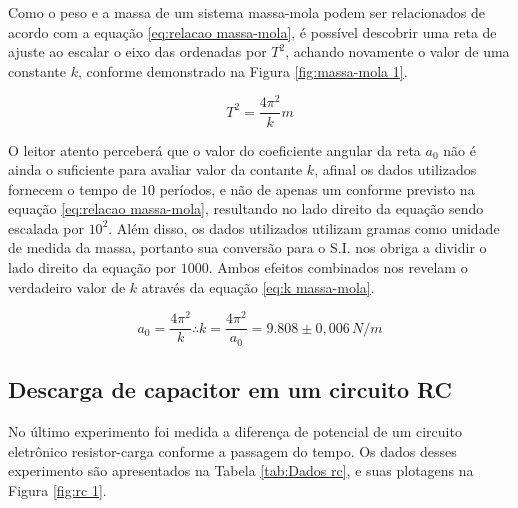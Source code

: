 \documentclass{article}
\begin{document}
Como o peso e a massa de um sistema massa-mola podem ser relacionados de acordo
com a equação \eqref{eq:relacao massa-mola}, é possível descobrir uma reta de
ajuste ao escalar o eixo das ordenadas por $T^2$, achando novamente o valor de
uma constante $k$, conforme demonstrado na Figura \ref{fig:massa-mola 1}.

\begin{equation}
    \label{eq:relacao massa-mola}
    T^2 = \frac{4\pi^2}{k}m
\end{equation}

O leitor atento perceberá que o valor do coeficiente angular da reta $a_0$ não é
ainda o suficiente para avaliar valor da contante $k$, afinal os dados
utilizados fornecem o tempo de $10$ períodos, e não de apenas um conforme
previsto na equação \eqref{eq:relacao massa-mola}, resultando no lado direito da
equação sendo escalada por $10^2$. Além disso, os dados utilizados utilizam
gramas como unidade de medida da massa, portanto sua conversão para o S.I. nos
obriga a dividir o lado direito da equação por $1000$. Ambos efeitos combinados
nos revelam o verdadeiro valor de $k$ através da equação \eqref{eq:k massa-mola}.

\begin{equation}
    \label{eq:k massa-mola}
    a_0 = \frac{4\pi^2}{k} \therefore k = \frac{4\pi^2}{a_0} = 9.808 \pm 0,006 \, N/m
\end{equation}

\subsection{Descarga de capacitor em um circuito RC}

No último experimento foi medida a diferença de potencial de um circuito eletrônico
resistor-carga conforme a passagem do tempo. Os dados desses experimento são
apresentados na Tabela \ref{tab:Dados rc}, e suas plotagens na Figura
\ref{fig:rc 1}.
\end{document}
